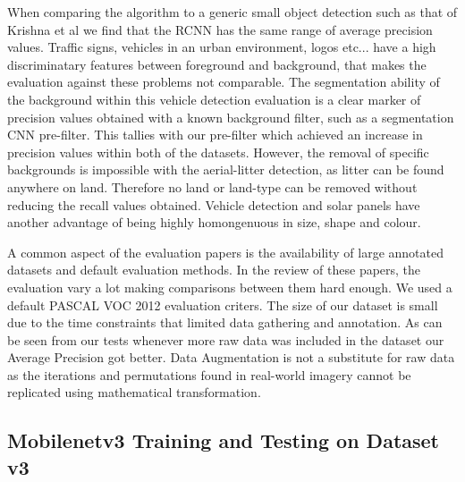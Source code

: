 \documentclass{IEEEtran}
\begin{document}
When comparing the algorithm to a generic small object detection such as that of Krishna et al \cite{Krishna} we find that the RCNN has the same range of average precision values. Traffic signs, vehicles in an urban environment, logos etc... have a high discriminatary features between foreground and background, that makes the evaluation against these problems not comparable. The segmentation ability of the background within this vehicle detection evaluation is a clear marker of precision values obtained with a known background filter, such as a segmentation CNN pre-filter. This tallies with our pre-filter which achieved an increase in precision values within both of the datasets. However, the removal of specific backgrounds is impossible with the aerial-litter detection, as litter can be found anywhere on land. Therefore no land or land-type can be removed without reducing the recall values obtained. Vehicle detection and solar panels have another advantage of being highly homongenuous in size, shape and colour.\newline

A common aspect of the evaluation papers is the availability of large annotated datasets and default evaluation methods. In the review of these papers, the evaluation vary a lot making comparisons between them hard enough. We used a default PASCAL VOC 2012 evaluation criters. The size of our dataset is small due to the time constraints that limited data gathering and annotation. As can be seen from our tests whenever more raw data was included in the dataset our Average Precision got better. Data Augmentation is not a substitute for raw data as the iterations and permutations found in real-world imagery cannot be replicated using mathematical transformation. \newline

\appendix

\subsection{Mobilenetv3 Training and Testing on Dataset v3}
\label{mobilenet}




\end{document}
